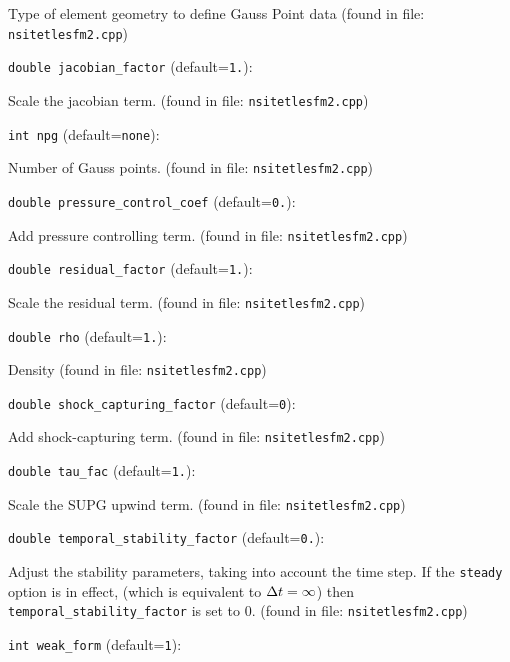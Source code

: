 Type of element geometry to define Gauss Point data
 (found in file: \verb+nsitetlesfm2.cpp+)
\item\verb+double jacobian_factor+ {\rm(default=\verb|1.|)}:

Scale the jacobian term. 
 (found in file: \verb+nsitetlesfm2.cpp+)
\item\verb+int npg+ {\rm(default=\verb|none|)}:

Number of Gauss points.
 (found in file: \verb+nsitetlesfm2.cpp+)
\item\verb+double pressure_control_coef+ {\rm(default=\verb|0.|)}:

Add pressure controlling term. 
 (found in file: \verb+nsitetlesfm2.cpp+)
\item\verb+double residual_factor+ {\rm(default=\verb|1.|)}:

Scale the residual term. 
 (found in file: \verb+nsitetlesfm2.cpp+)
\item\verb+double rho+ {\rm(default=\verb|1.|)}:

Density
 (found in file: \verb+nsitetlesfm2.cpp+)
\item\verb+double shock_capturing_factor+ {\rm(default=\verb|0|)}:

Add shock-capturing term.
 (found in file: \verb+nsitetlesfm2.cpp+)
\item\verb+double tau_fac+ {\rm(default=\verb|1.|)}:

Scale the SUPG upwind term. 
 (found in file: \verb+nsitetlesfm2.cpp+)
\item\verb+double temporal_stability_factor+ {\rm(default=\verb|0.|)}:

Adjust the stability parameters, taking into account
the time step. If the \verb+steady+ option is in effect,
(which is equivalent to ${\Delta t}=\infty$) then
\verb+temporal_stability_factor+ is set to 0.
 (found in file: \verb+nsitetlesfm2.cpp+)
\item\verb+int weak_form+ {\rm(default=\verb|1|)}:

